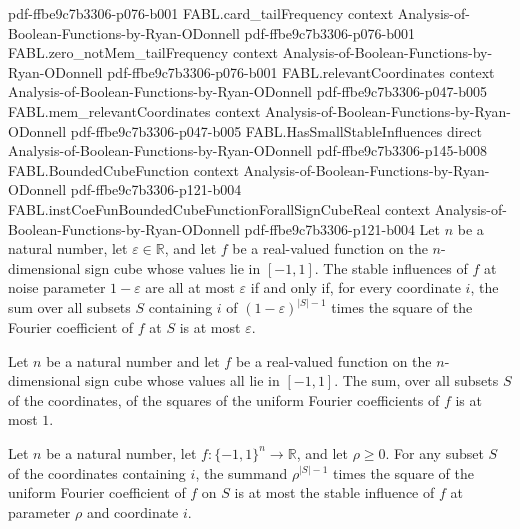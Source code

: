 \begin{theorem}
  {pdf-ffbe9c7b3306-p076-b001}
\proofstep
  {FABL.card_tailFrequency}
  {context}
  {Analysis-of-Boolean-Functions-by-Ryan-ODonnell}
  {pdf-ffbe9c7b3306-p076-b001}
\proofstep
  {FABL.zero_notMem_tailFrequency}
  {context}
  {Analysis-of-Boolean-Functions-by-Ryan-ODonnell}
  {pdf-ffbe9c7b3306-p076-b001}
\proofstep
  {FABL.relevantCoordinates}
  {context}
  {Analysis-of-Boolean-Functions-by-Ryan-ODonnell}
  {pdf-ffbe9c7b3306-p047-b005}
\proofstep
  {FABL.mem_relevantCoordinates}
  {context}
  {Analysis-of-Boolean-Functions-by-Ryan-ODonnell}
  {pdf-ffbe9c7b3306-p047-b005}
\proofstep
  {FABL.HasSmallStableInfluences}
  {direct}
  {Analysis-of-Boolean-Functions-by-Ryan-ODonnell}
  {pdf-ffbe9c7b3306-p145-b008}
\proofstep
  {FABL.BoundedCubeFunction}
  {context}
  {Analysis-of-Boolean-Functions-by-Ryan-ODonnell}
  {pdf-ffbe9c7b3306-p121-b004}
\proofstep
  {FABL.instCoeFunBoundedCubeFunctionForallSignCubeReal}
  {context}
  {Analysis-of-Boolean-Functions-by-Ryan-ODonnell}
  {pdf-ffbe9c7b3306-p121-b004}
Let $n$ be a natural number, let $\varepsilon\in\mathbb R$, and let $f$ be a real-valued
function on the $n$-dimensional sign cube whose values lie in $[-1,1]$. The stable
influences of $f$ at noise parameter $1-\varepsilon$ are all at most $\varepsilon$ if
and only if, for every coordinate $i$, the sum over all subsets $S$ containing $i$ of
$(1-\varepsilon)^{|S|-1}$ times the square of the Fourier coefficient of $f$ at $S$ is
at most $\varepsilon$.
\end{theorem}

\begin{theorem}
\label{FABL.BoundedCubeFunction.sum_sq_fourierCoeff_le_one}
\leanok
{}
Let $n$ be a natural number and let $f$ be a real-valued function on the $n$-dimensional
sign cube whose values all lie in $[-1,1]$. The sum, over all subsets $S$ of the
coordinates, of the squares of the uniform Fourier coefficients of $f$ is at most $1$.
\end{theorem}

\begin{theorem}
\label{FABL.stableInfluence_term_le}
\leanok
{}
Let $n$ be a natural number, let $f:\{−1,1\}^n\to\mathbb R$, and let $\rho\ge0$.
For any subset $S$ of the coordinates containing $i$, the summand $\rho^{|S|-1}$ times
the square of the uniform Fourier coefficient of $f$ on $S$ is at most the stable
influence of $f$ at parameter $\rho$ and coordinate $i$.
\end{theorem}

